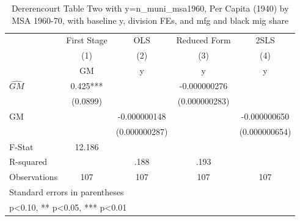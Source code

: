 \begin{table}[htbp]\centering
\def\sym#1{\ifmmode^{#1}\else\(^{#1}\)\fi}
\caption{Dererencourt Table Two with y=n\_muni\_msa1960, Per Capita (1940) by MSA 1960-70, with baseline y, division FEs, and mfg and black mig share}
\begin{tabular}{l*{4}{c}}
\toprule
                    & First Stage   &         OLS   &Reduced Form   &        2SLS   \\
                    &\multicolumn{1}{c}{(1)}&\multicolumn{1}{c}{(2)}&\multicolumn{1}{c}{(3)}&\multicolumn{1}{c}{(4)}\\
                    &\multicolumn{1}{c}{GM}&\multicolumn{1}{c}{y}&\multicolumn{1}{c}{y}&\multicolumn{1}{c}{y}\\
\midrule
$\hat{GM}$          &       0.425***&               &-0.000000276   &               \\
                    &    (0.0899)   &               &(0.000000283)   &               \\
\addlinespace
GM                  &               &-0.000000148   &               &-0.000000650   \\
                    &               &(0.000000287)   &               &(0.000000654)   \\
\midrule
F-Stat              &      12.186   &               &               &               \\
R-squared           &               &        .188   &        .193   &               \\
Observations        &         107   &         107   &         107   &         107   \\
\bottomrule
\multicolumn{5}{l}{\footnotesize Standard errors in parentheses}\\
\multicolumn{5}{l}{\footnotesize * p<0.10, ** p<0.05, *** p<0.01}\\
\end{tabular}
\end{table}
